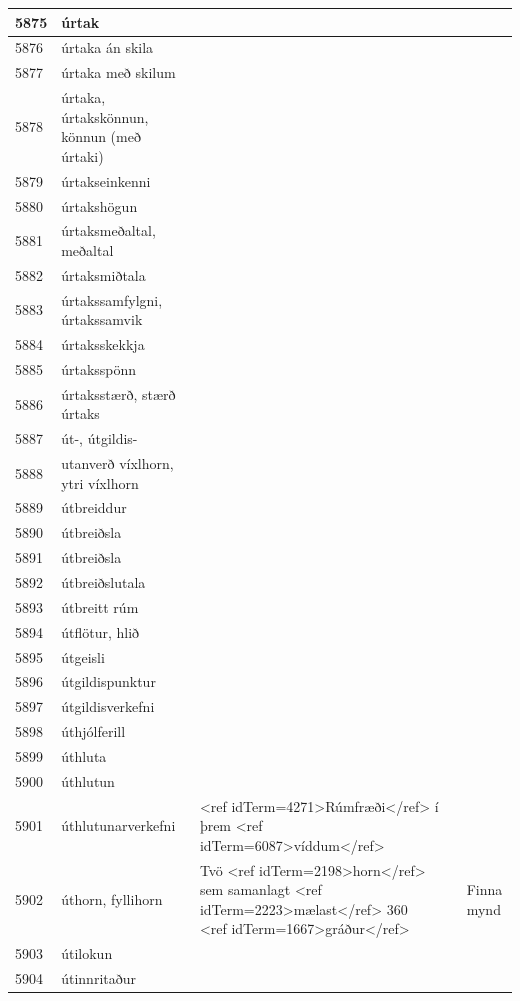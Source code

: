 \begin{longtable}{p{}|p{}|p{}|p{}|p{}}
\hline
5875 & úrtak &  &  &  \\
\hline
5876 & úrtaka án skila &  &  &  \\
\hline
5877 & úrtaka með skilum &  &  &  \\
\hline
5878 & úrtaka, úrtakskönnun, könnun (með úrtaki) &  &  &  \\
\hline
5879 & úrtakseinkenni &  &  &  \\
\hline
5880 & úrtakshögun &  &  &  \\
\hline
5881 & úrtaksmeðaltal, meðaltal &  &  &  \\
\hline
5882 & úrtaksmiðtala &  &  &  \\
\hline
5883 & úrtakssamfylgni, úrtakssamvik &  &  &  \\
\hline
5884 & úrtaksskekkja &  &  &  \\
\hline
5885 & úrtaksspönn &  &  &  \\
\hline
5886 & úrtaksstærð, stærð úrtaks &  &  &  \\
\hline
5887 & út-, útgildis- &  &  &  \\
\hline
5888 & utanverð víxlhorn, ytri víxlhorn &  &  &  \\
\hline
5889 & útbreiddur &  &  &  \\
\hline
5890 & útbreiðsla &  &  &  \\
\hline
5891 & útbreiðsla &  &  &  \\
\hline
5892 & útbreiðslutala &  &  &  \\
\hline
5893 & útbreitt rúm &  &  &  \\
\hline
5894 & útflötur, hlið &  &  &  \\
\hline
5895 & útgeisli &  &  &  \\
\hline
5896 & útgildispunktur &  &  &  \\
\hline
5897 & útgildisverkefni &  &  &  \\
\hline
5898 & úthjólferill &  &  &  \\
\hline
5899 & úthluta &  &  &  \\
\hline
5900 & úthlutun &  &  &  \\
\hline
5901 & úthlutunarverkefni & <ref idTerm=4271>Rúmfræði</ref> í þrem <ref idTerm=6087>víddum</ref> &  &  \\
\hline
5902 & úthorn, fyllihorn & Tvö <ref idTerm=2198>horn</ref> sem samanlagt <ref idTerm=2223>mælast</ref> 360 <ref idTerm=1667>gráður</ref> &  & Finna mynd \\
\hline
5903 & útilokun &  &  &  \\
\hline
5904 & útinnritaður &  &  &  \\

\end{longtable}
